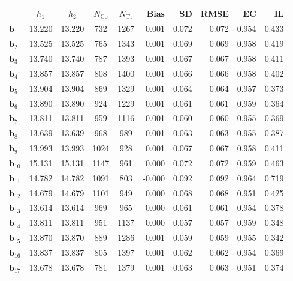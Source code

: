 \documentclass[10pt]{article}
\newcommand{\bb}{\mathbf{b}}
\begin{document}
\begin{table}[p]
    \caption{First-Stage Effects (Simulations, $s=3$, ITT Bandwidth Selector).}
    \label{tab:sa-simuls-fs-s3}
\end{table}

\begin{table}[p]
    \centering
\begin{tabular}{lccccrrrrr}
\toprule\toprule
 & $h_1$ & $h_2$ & $N_{\mathrm{Co}}$ & $N_{\mathrm{Tr}}$ & Bias & SD & RMSE & EC & IL \\
\midrule
$\bb_{1}$ & 13.220 & 13.220 & 732 & 1267 & 0.001 & 0.072 & 0.072 & 0.954 & 0.433 \\
$\bb_{2}$ & 13.525 & 13.525 & 765 & 1343 & 0.001 & 0.069 & 0.069 & 0.958 & 0.419 \\
$\bb_{3}$ & 13.740 & 13.740 & 787 & 1393 & 0.001 & 0.067 & 0.067 & 0.958 & 0.411 \\
$\bb_{4}$ & 13.857 & 13.857 & 808 & 1400 & 0.001 & 0.066 & 0.066 & 0.958 & 0.402 \\
$\bb_{5}$ & 13.904 & 13.904 & 869 & 1329 & 0.001 & 0.064 & 0.064 & 0.957 & 0.373 \\
$\bb_{6}$ & 13.890 & 13.890 & 924 & 1229 & 0.001 & 0.061 & 0.061 & 0.959 & 0.364 \\
$\bb_{7}$ & 13.811 & 13.811 & 959 & 1116 & 0.001 & 0.060 & 0.060 & 0.955 & 0.369 \\
$\bb_{8}$ & 13.639 & 13.639 & 968 & 989 & 0.001 & 0.063 & 0.063 & 0.955 & 0.387 \\
$\bb_{9}$ & 13.993 & 13.993 & 1024 & 928 & 0.001 & 0.067 & 0.067 & 0.958 & 0.411 \\
$\bb_{10}$ & 15.131 & 15.131 & 1147 & 961 & 0.000 & 0.072 & 0.072 & 0.959 & 0.463 \\
$\bb_{11}$ & 14.782 & 14.782 & 1091 & 803 & -0.000 & 0.092 & 0.092 & 0.964 & 0.719 \\
$\bb_{12}$ & 14.679 & 14.679 & 1101 & 949 & 0.000 & 0.068 & 0.068 & 0.951 & 0.425 \\
$\bb_{13}$ & 13.614 & 13.614 & 969 & 965 & 0.000 & 0.061 & 0.061 & 0.954 & 0.378 \\
$\bb_{14}$ & 13.811 & 13.811 & 951 & 1137 & 0.000 & 0.057 & 0.057 & 0.959 & 0.348 \\
$\bb_{15}$ & 13.870 & 13.870 & 889 & 1286 & 0.001 & 0.059 & 0.059 & 0.955 & 0.342 \\
$\bb_{16}$ & 13.837 & 13.837 & 805 & 1397 & 0.001 & 0.062 & 0.062 & 0.954 & 0.369 \\
$\bb_{17}$ & 13.678 & 13.678 & 781 & 1379 & 0.001 & 0.063 & 0.063 & 0.951 & 0.374 \\

\end{tabular}
\end{table}
\end{document}
